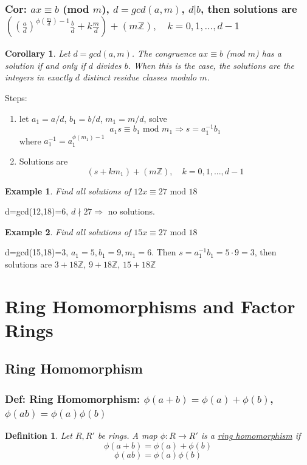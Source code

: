 \documentclass[11pt,a4paper]{article}
\newtheorem{example}{Example}
\newtheorem{corollary}{Corollary}
\newtheorem{definition}{Definition}
\begin{document}
\subsubsection{Cor: $ax \equiv b$ (mod $m$), $d=gcd(a,m)$, $d|b$, then solutions are $((\frac{a}{d})^{\phi(\frac{m}{d})-1}\frac{b}{d}+k\frac{m}{d})+(m \mathbb{Z}),\quad k=0,1,...,d-1$}
\begin{corollary}
    Let $d=gcd(a,m)$. The congruence $ax \equiv b$ (mod $m$) has a
    solution if and only if $d$ divides $b$. When this is the case, the solutions are the integers in
    exactly $d$ distinct residue classes modulo $m$.
\end{corollary}
Steps:
\begin{enumerate}[(1)]
    \item let $a_1=a/d$, $b_1=b/d$, $m_1=m/d$, solve $$a_1s\equiv b_1 \text{ mod } m_1 \Rightarrow	s=a_1^{-1}b_1$$
    where $a_1^{-1}=a_1^{\phi(m_1)-1}$
    \item Solutions are $$(s+km_1)+(m \mathbb{Z}),\quad k=0,1,...,d-1$$
\end{enumerate}
\begin{example}
Find all solutions of $12 x\equiv 27 \text{ mod }18$
\end{example}
d=gcd(12,18)=6, $d\nmid 27 \Rightarrow$ no solutions.

\begin{example}
    Find all solutions of $15 x\equiv 27 \text{ mod }18$
\end{example}
d=gcd(15,18)=3, $a_1=5,b_1=9,m_1=6$. Then $s=a_1^{-1}b_1=5\cdot 9=3$, then solutions are $3+18 \mathbb{Z}$, $9+18 \mathbb{Z}$, $15+18 \mathbb{Z}$



\section{Ring Homomorphisms and Factor Rings}

\subsection{Ring Homomorphism}
\subsubsection{Def: Ring Homomorphism: $\phi(a+b)=\phi(a)+\phi(b)$, $\phi(ab)=\phi(a)\phi(b)$}
\begin{definition}
    Let $R,R'$ be rings. A map $\phi:R \rightarrow R'$ is a \underline{ring homomorphism} if $$\phi(a+b)=\phi(a)+\phi(b)$$ $$\phi(ab)=\phi(a)\phi(b)$$
\end{definition}
\end{document}
